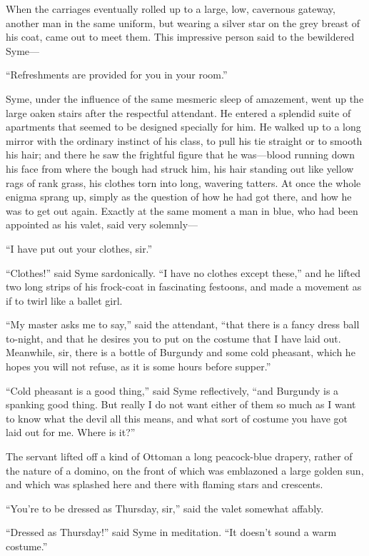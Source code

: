 \documentclass{book}
\begin{document}
When the carriages eventually rolled up to a large, low, cavernous gateway, another man in the same uniform, but wearing a silver star on the grey breast of his coat, came out to meet them. This impressive person said to the bewildered Syme—

“Refreshments are provided for you in your room.”

Syme, under the influence of the same mesmeric sleep of amazement, went up the large oaken stairs after the respectful attendant. He entered a splendid suite of apartments that seemed to be designed specially for him. He walked up to a long mirror with the ordinary instinct of his class, to pull his tie straight or to smooth his hair; and there he saw the frightful figure that he was—blood running down his face from where the bough had struck him, his hair standing out like yellow rags of rank grass, his clothes torn into long, wavering tatters. At once the whole enigma sprang up, simply as the question of how he had got there, and how he was to get out again. Exactly at the same moment a man in blue, who had been appointed as his valet, said very solemnly—

“I have put out your clothes, sir.”

“Clothes!” said Syme sardonically. “I have no clothes except these,” and he lifted two long strips of his frock-coat in fascinating festoons, and made a movement as if to twirl like a ballet girl.

“My master asks me to say,” said the attendant, “that there is a fancy dress ball to-night, and that he desires you to put on the costume that I have laid out. Meanwhile, sir, there is a bottle of Burgundy and some cold pheasant, which he hopes you will not refuse, as it is some hours before supper.”

“Cold pheasant is a good thing,” said Syme reflectively, “and Burgundy is a spanking good thing. But really I do not want either of them so much as I want to know what the devil all this means, and what sort of costume you have got laid out for me. Where is it?”

The servant lifted off a kind of Ottoman a long peacock-blue drapery, rather of the nature of a domino, on the front of which was emblazoned a large golden sun, and which was splashed here and there with flaming stars and crescents.

“You’re to be dressed as Thursday, sir,” said the valet somewhat affably.

“Dressed as Thursday!” said Syme in meditation. “It doesn’t sound a warm costume.”
\end{document}

